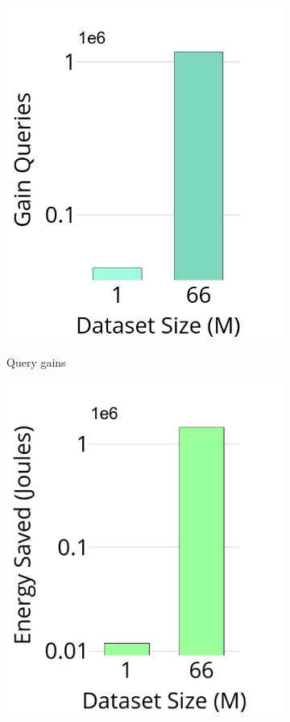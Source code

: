 \begin{figure}[!htb]
\begin{subfigure}{0.3\textwidth}
		\includegraphics[width=\textwidth]{../img/oigas/SS/deepqrsidxep.png}
  	\label{oigas:ss:impact:qg}
		\caption{Query gains} 
		\label{fig:search:query:performance:25GB:hard:10p}
		\end{subfigure}
		\begin{subfigure}{0.3\textwidth}
		\includegraphics[width=\textwidth]{../img/oigas/SS/deepjidxep.pdf}

\end{subfigure}
\end{figure}

